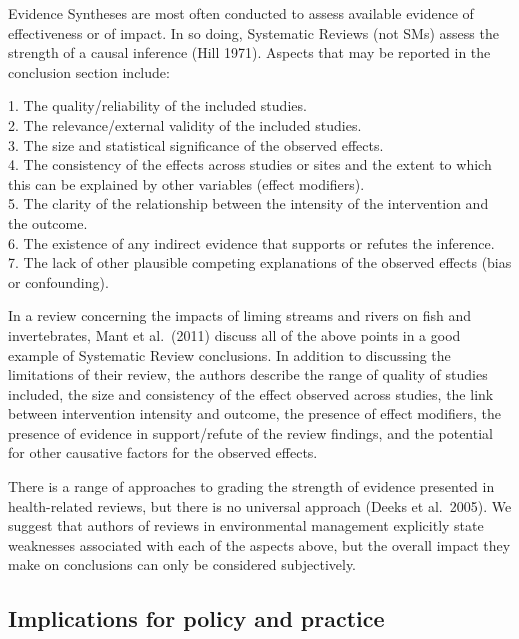 \documentclass[
  letterpaper,
  DIV=11,
  numbers=noendperiod]{scrreprt}
\begin{document}
Evidence Syntheses are most often conducted to assess available evidence
of effectiveness or of impact. In so doing, Systematic Reviews (not SMs)
assess the strength of a causal inference (Hill 1971). Aspects that may
be reported in the conclusion section include:

1. The quality/reliability of the included studies.\\
2. The relevance/external validity of the included studies.\\
3. The size and statistical significance of the observed effects.\\
4. The consistency of the effects across studies or sites and the extent
to which this can be explained by other variables (effect modifiers).\\
5. The clarity of the relationship between the intensity of the
intervention and the outcome.\\
6. The existence of any indirect evidence that supports or refutes the
inference.\\
7. The lack of other plausible competing explanations of the observed
effects (bias or confounding).

In a review concerning the impacts of liming streams and rivers on fish
and invertebrates, Mant et al.~(2011) discuss all of the above points in
a good example of Systematic Review conclusions. In addition to
discussing the limitations of their review, the authors describe the
range of quality of studies included, the size and consistency of the
effect observed across studies, the link between intervention intensity
and outcome, the presence of effect modifiers, the presence of evidence
in support/refute of the review findings, and the potential for other
causative factors for the observed effects.

There is a range of approaches to grading the strength of evidence
presented in health-related reviews, but there is no universal approach
(Deeks et al.~2005). We suggest that authors of reviews in environmental
management explicitly state weaknesses associated with each of the
aspects above, but the overall impact they make on conclusions can only
be considered subjectively.

\subsection{\texorpdfstring{\textbf{Implications for policy and
practice}}{Implications for policy and practice}}\label{implications-for-policy-and-practice}
\end{document}
